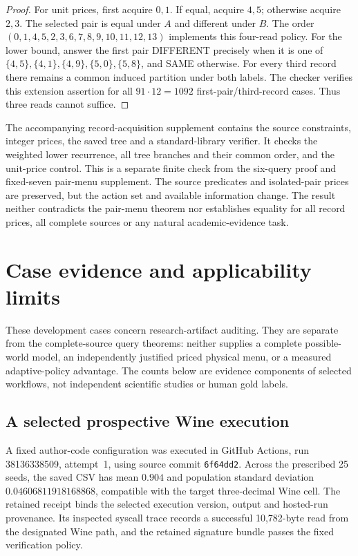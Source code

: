 \documentclass[pdflatex,sn-mathphys-num]{sn-jnl}
\theoremstyle{thmstyleone}
\theoremstyle{thmstylethree}
\theoremstyle{thmstyletwo}
\begin{document}
\begin{proof}
For unit prices, first acquire $0,1$. If equal, acquire $4,5$; otherwise acquire $2,3$. The selected pair is equal under $A$ and different under $B$. The order $(0,1,4,5,2,3,6,7,8,9,10,11,12,13)$ implements this four-read policy. For the lower bound, answer the first pair DIFFERENT precisely when it is one of $\{4,5\},\{4,1\},\{4,9\},\{5,0\},\{5,8\}$, and SAME otherwise. For every third record there remains a common induced partition under both labels. The checker verifies this extension assertion for all $91\cdot12=1092$ first-pair/third-record cases. Thus three reads cannot suffice.
\end{proof}

The accompanying record-acquisition supplement contains the source constraints, integer prices, the saved tree and a standard-library verifier. It checks the weighted lower recurrence, all tree branches and their common order, and the unit-price control. This is a separate finite check from the six-query proof and fixed-seven pair-menu supplement. The source predicates and isolated-pair prices are preserved, but the action set and available information change. The result neither contradicts the pair-menu theorem nor establishes equality for all record prices, all complete sources or any natural academic-evidence task.

\section{Case evidence and applicability limits}\label{app:cases}
These development cases concern research-artifact auditing. They are separate from the complete-source query theorems: neither supplies a complete possible-world model, an independently justified priced physical menu, or a measured adaptive-policy advantage. The counts below are evidence components of selected workflows, not independent scientific studies or human gold labels.

\subsection{A selected prospective Wine execution}
A fixed author-code configuration was executed in GitHub Actions, run 38136338509, attempt~1, using source commit \texttt{6f64dd2}. Across the prescribed 25 seeds, the saved CSV has mean $0.904$ and population standard deviation $0.04606811918168868$, compatible with the target three-decimal Wine cell. The retained receipt binds the selected execution version, output and hosted-run provenance. Its inspected syscall trace records a successful 10,782-byte read from the designated Wine path, and the retained signature bundle passes the fixed verification policy.
\end{document}
